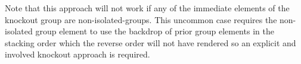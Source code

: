 Note that this
approach will not work if any of the immediate
elements of the knockout group are non-isolated-groups.
This uncommon case requires the non-isolated group element to use the
backdrop of prior group elements in the stacking order which the reverse
order will not have rendered so an explicit and involved knockout approach
is required.

%

